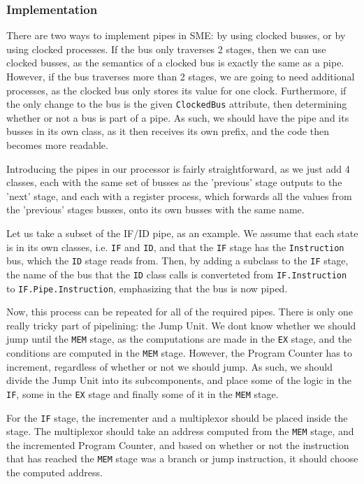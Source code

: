 \subsubsection*{Implementation}
There are two ways to implement pipes in SME: by using clocked busses, or by
using clocked processes. If the bus only traverses 2 stages, then we can use
clocked busses, as the semantics of a clocked bus is exactly the same as a
pipe. However, if the bus traverses more than 2 stages, we are going to need
additional processes, as the clocked bus only stores its value for one clock.
Furthermore, if the only change to the bus is the given \texttt{ClockedBus}
attribute, then determining whether or not a bus is part of a pipe. As such, we
should have the pipe and its busses in its own class, as it then receives its
own prefix, and the code then becomes more readable.

Introducing the pipes in our processor is fairly straightforward, as we just
add 4 classes, each with the same set of busses as the 'previous' stage outputs
to the 'next' stage, and each with a register process, which forwards all the
values from the 'previous' stages busses, onto its own busses with the same
name.

Let us take a subset of the IF/ID pipe, as an example. We assume that each
state is in its own classes, i.e. \texttt{IF} and \texttt{ID}, and that the
\texttt{IF} stage has the \texttt{Instruction} bus, which the \texttt{ID} stage
reads from. Then, by adding a subclass to the \texttt{IF} stage, the name of
the bus that the \texttt{ID} class calls is converteted from
\texttt{IF.Instruction} to \texttt{IF.Pipe.Instruction}, emphasizing that the
bus is now piped.

Now, this process can be repeated for all of the required pipes. There is only
one really tricky part of pipelining: the Jump Unit. We dont know whether we
should jump until the \texttt{MEM} stage, as the computations are made in the
\texttt{EX} stage, and the conditions are computed in the \texttt{MEM} stage.
However, the Program Counter has to increment, regardless of whether or not we
should jump. As such, we should divide the Jump Unit into its subcomponents,
and place some of the logic in the \texttt{IF}, some in the \texttt{EX} stage
and finally some of it in the \texttt{MEM} stage.

For the \texttt{IF} stage, the incrementer and a multiplexor should be placed
inside the stage. The multiplexor should take an address computed from the
\texttt{MEM} stage, and the incremented Program Counter, and based on whether
or not the instruction that has reached the \texttt{MEM} stage was a branch or
jump instruction, it should choose the computed address.

